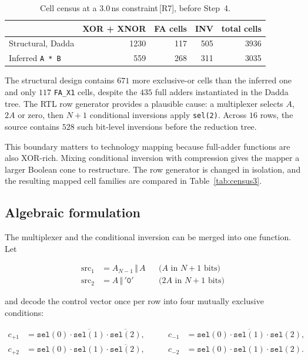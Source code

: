 \documentclass[11pt,a4paper]{article}
\newcommand{\src}[1]{\,{\footnotesize\color{accent}[#1]}}
\begin{document}
\begin{table}[!ht]
\centering\small
\begin{tabular}{@{}lrrrr@{}}
\toprule
& \textbf{XOR + XNOR} & \textbf{FA cells} & \textbf{INV} & \textbf{total cells} \\
\midrule
Structural, Dadda            & 1230 & 117 & 505 & 3936 \\
Inferred \texttt{A * B}      &  559 & 268 & 311 & 3035 \\
\bottomrule
\end{tabular}
\caption{Cell census at a $3.0$\,ns constraint\src{R7}, before Step~4.}
\end{table}

The structural design contains $671$ more exclusive-or cells than the inferred
one and only $117$ \texttt{FA\_X1} cells, despite the $435$ full adders
instantiated in the Dadda tree. The RTL row generator provides a plausible
cause: a multiplexer selects $A$, $2A$ or zero, then $N+1$ conditional
inversions apply \texttt{sel(2)}. Across $16$ rows, the source contains $528$
such bit-level inversions before the reduction tree.

This boundary matters to technology mapping because full-adder functions are
also XOR-rich. Mixing conditional inversion with compression gives the mapper
a larger Boolean cone to restructure. The row generator is changed in isolation,
and the resulting mapped cell families are compared in Table~\ref{tab:census3}.

\subsection{Algebraic formulation}

The multiplexer and the conditional inversion can be merged into one function.
Let

\begin{align}
\mathrm{src}_1 &= A_{N-1} \,\Vert\, A            &&\text{($A$ in $N+1$ bits)}\\
\mathrm{src}_2 &= A \,\Vert\, \mathtt{'0'}       &&\text{($2A$ in $N+1$ bits)}
\end{align}

and decode the control vector once per row into four mutually exclusive
conditions:

\begin{equation}
\begin{aligned}
c_{+1} &= \mathtt{sel}(0)\cdot\overline{\mathtt{sel}(1)}\cdot\overline{\mathtt{sel}(2)}, &\qquad
c_{-1} &= \mathtt{sel}(0)\cdot\overline{\mathtt{sel}(1)}\cdot\mathtt{sel}(2), \\
c_{+2} &= \mathtt{sel}(0)\cdot\mathtt{sel}(1)\cdot\overline{\mathtt{sel}(2)}, &\qquad
c_{-2} &= \mathtt{sel}(0)\cdot\mathtt{sel}(1)\cdot\mathtt{sel}(2).
\end{aligned}
\end{equation}
\end{document}
